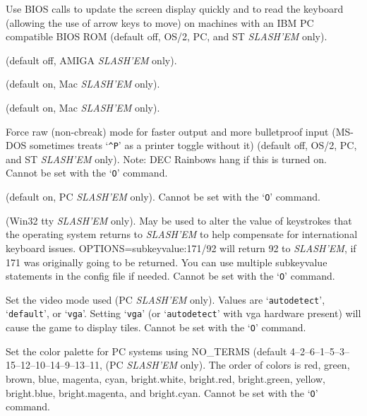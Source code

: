 \item[\ib{BIOS}]
Use BIOS calls to update the screen
display quickly and to read the keyboard (allowing the use of arrow
keys to move) on machines with an IBM PC compatible BIOS ROM (default off,
OS/2, PC, and ST {\it SLASH'EM\/} only).

\item[\ib{flush}]
(default off, AMIGA {\it SLASH'EM\/} only).

\item[\ib{MACgraphics}]
(default on, Mac {\it SLASH'EM\/} only).

\item[\ib{page\_wait}]
(default on, Mac {\it SLASH'EM\/} only).

\item[\ib{rawio}]
Force raw (non-cbreak) mode for faster output and more
bulletproof input (MS-DOS sometimes treats `{\tt \^{}P}' as a printer toggle
without it) (default off, OS/2, PC, and ST {\it SLASH'EM\/} only).
Note:  DEC Rainbows hang if this is turned on.
Cannot be set with the `{\tt O}' command.

\item[\ib{soundcard}]
(default on, PC {\it SLASH'EM\/} only).
Cannot be set with the `{\tt O}' command.

\item[\ib{subkeyvalue}]
(Win32 tty {\it SLASH'EM\/} only).
May be used to alter the value of keystrokes that the operating system
returns to {\it SLASH'EM\/} to help compensate for international keyboard issues.
OPTIONS=subkeyvalue:171/92
will return 92 to {\it SLASH'EM}, if 171 was originally going to be returned.
You can use multiple subkeyvalue statements in the config file if needed.
Cannot be set with the `{\tt O}' command.

\item[\ib{video}]
Set the video mode used (PC {\it SLASH'EM\/} only).
Values are `{\tt autodetect}', `{\tt default}', or `{\tt vga}'.
Setting `{\tt vga}' (or `{\tt autodetect}' with vga hardware present) will cause
the game to display tiles. 
Cannot be set with the `{\tt O}' command.

\item[\ib{videocolors}]
Set the color palette for PC systems using NO\_TERMS
(default 4--2--6--1--5--3--15--12--10--14--9--13--11, (PC {\it SLASH'EM\/} only).
The order of colors is red, green, brown, blue, magenta, cyan,
bright.white, bright.red, bright.green, yellow, bright.blue,
bright.magenta, and bright.cyan.
Cannot be set with the `{\tt O}' command.

